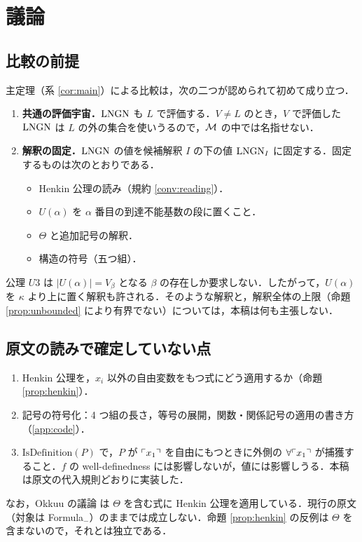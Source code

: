 \section{議論}\label{sec:discussion}

\subsection{比較の前提}
主定理（系 \ref{cor:main}）による比較は，次の二つが認められて初めて成り立つ．
\begin{enumerate}
\item \textbf{共通の評価宇宙．}$\mathrm{LNGN}$ も $L$ で評価する．$V\neq L$ のとき，$V$ で評価した $\mathrm{LNGN}$ は $L$ の外の集合を使いうるので，$\mathcal{M}$ の中では名指せない．
\item \textbf{解釈の固定．}$\mathrm{LNGN}$ の値を候補解釈 $I$ の下の値 $\mathrm{LNGN}_I$ に固定する．固定するものは次のとおりである．
  \begin{itemize}
  \item Henkin 公理の読み（規約 \ref{conv:reading}）．
  \item $U(\alpha)$ を $\alpha$ 番目の到達不能基数の段に置くこと．
  \item $\Theta$ と追加記号の解釈．
  \item 構造の符号（五つ組）．
  \end{itemize}
\end{enumerate}
公理 $U3$ は $|U(\alpha)|=V_\beta$ となる $\beta$ の存在しか要求しない．したがって，$U(\alpha)$ を $\kappa$ より上に置く解釈も許される．そのような解釈と，解釈全体の上限（命題 \ref{prop:unbounded} により有界でない）については，本稿は何も主張しない．

\subsection{原文の読みで確定していない点}
\begin{enumerate}
\item Henkin 公理を，$x_i$ 以外の自由変数をもつ式にどう適用するか（命題 \ref{prop:henkin}）．
\item 記号の符号化：4 つ組の長さ，等号の展開，関数・関係記号の適用の書き方（\ref{app:code}）．
\item $\mathrm{IsDefinition}(P)$ で，$P$ が $\ulcorner x_1\urcorner$ を自由にもつときに外側の $\forall\ulcorner x_1\urcorner$ が捕獲すること．$f$ の well-definedness には影響しないが，値には影響しうる．本稿は原文の代入規則どおりに実装した．
\end{enumerate}
なお，Okkuu の議論 \cite{okkuu} は $\Theta$ を含む式に Henkin 公理を適用している．現行の原文（対象は Formula$_-$）のままでは成立しない．命題 \ref{prop:henkin} の反例は $\Theta$ を含まないので，それとは独立である．

